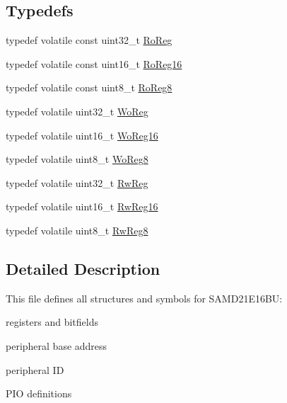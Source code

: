 \subsection*{Typedefs}
\begin{DoxyCompactItemize}
\item 
typedef volatile const uint32\+\_\+t \mbox{\hyperlink{group___s_a_m_d21_e16_b_u__definitions_ga5d556f8391af4141be23f7334ac9dd68}{Ro\+Reg}}
\item 
typedef volatile const uint16\+\_\+t \mbox{\hyperlink{group___s_a_m_d21_e16_b_u__definitions_gaebf6e33c2d49a802e06e22a95ea9d0d0}{Ro\+Reg16}}
\item 
typedef volatile const uint8\+\_\+t \mbox{\hyperlink{group___s_a_m_d21_e16_b_u__definitions_ga0d957f1433aaf5d70e4dc2b68288442d}{Ro\+Reg8}}
\item 
typedef volatile uint32\+\_\+t \mbox{\hyperlink{group___s_a_m_d21_e16_b_u__definitions_gac0f96d4e8018367b38f527007cf0eafd}{Wo\+Reg}}
\item 
typedef volatile uint16\+\_\+t \mbox{\hyperlink{group___s_a_m_d21_e16_b_u__definitions_ga0ab0e5f6c8301aa1c2068e511d854094}{Wo\+Reg16}}
\item 
typedef volatile uint8\+\_\+t \mbox{\hyperlink{group___s_a_m_d21_e16_b_u__definitions_ga5e336e5a36ee12ebeafb021108e5275b}{Wo\+Reg8}}
\item 
typedef volatile uint32\+\_\+t \mbox{\hyperlink{group___s_a_m_d21_e16_b_u__definitions_gacf1496e3bbe303e55f627fc7558a68c7}{Rw\+Reg}}
\item 
typedef volatile uint16\+\_\+t \mbox{\hyperlink{group___s_a_m_d21_e16_b_u__definitions_gacce07556c80fc352ae607f225f19fed5}{Rw\+Reg16}}
\item 
typedef volatile uint8\+\_\+t \mbox{\hyperlink{group___s_a_m_d21_e16_b_u__definitions_gae361754be775bb192f85821d3ab33c17}{Rw\+Reg8}}
\end{DoxyCompactItemize}


\subsection{Detailed Description}
This file defines all structures and symbols for S\+A\+M\+D21\+E16\+BU\+:
\begin{DoxyItemize}
\item registers and bitfields
\item peripheral base address
\item peripheral ID
\item P\+IO definitions 
\end{DoxyItemize}

